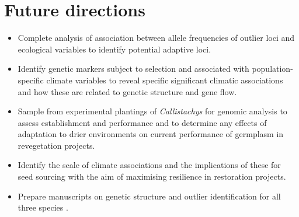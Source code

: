 \documentclass[version=last,
    paper=a4, %
    10pt, %
    usenames,
    dvipsnames,
    oneside, %
    headings=openany, %
    DIV=15 %
]{scrbook}
\begin{document}
\section*{Future directions}
\begin{itemize}
\itemsep1pt\parskip0pt
\item
  Complete analysis of association between allele frequencies of outlier
  loci and ecological variables to identify potential adaptive loci.
\item
  Identify genetic markers subject to selection and associated with
  population-specific climate variables to reveal specific significant
  climatic associations and how these are related to genetic structure
  and gene flow.
\item
  Sample from experimental plantings of \emph{Callistachys} for genomic
  analysis to assess establishment and performance and to determine any
  effects of adaptation to drier environments on current performance of
  germplasm in revegetation projects.
\item
  Identify the scale of climate associations and the implications of
  these for seed sourcing with the aim of maximising resilience in
  restoration projects.
\item
  Prepare manuscripts on genetic structure and outlier identification
  for all three species .
\end{itemize}



\end{document}
